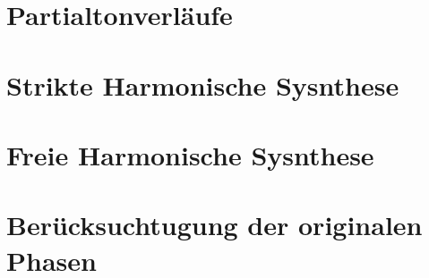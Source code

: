 \section{Partialtonverläufe}
\label{sec:1}

\subsection{}

\subsection{}

\subsection{}


\section{Strikte Harmonische Sysnthese}
\label{sec:2}

\subsection{}

\subsection{}


\section{Freie Harmonische Sysnthese}
\label{sec:3}

\subsection{}

\subsection{}


\section{Berücksuchtugung der originalen Phasen}
\label{sec:4}